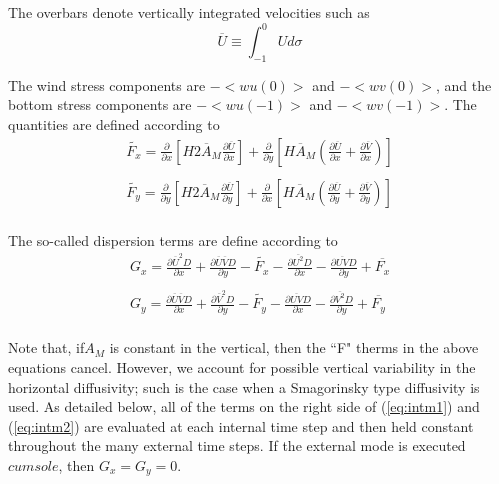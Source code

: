 \documentclass[oribibl]{llncs}
\begin{document}
The overbars denote vertically integrated velocities such as
\begin{equation}
\overline{U} \equiv \int_{-1}^{0} U d \sigma
\end{equation}

The wind stress components are $-<wu(0)>$  and $-<wv(0)> $, and the bottom stress components are $-<wu(-1)>$  and $-<wv(-1)> $. The quantities are defined according to
\begin{eqnarray}
\tilde{F_x}=\frac{\partial}{\partial x} \left[ H2 \overline{A}_M \frac{\partial \overline{U}}{\partial x} \right] +\frac{\partial}{\partial y} \left[ H \overline{A}_M \left( \frac{\partial \overline{U}}{\partial x} + \frac{\partial \overline{V}}{\partial x}\right) \right] \\
\nonumber\\
\tilde{F_y}=\frac{\partial}{\partial y} \left[ H2 \overline{A}_M \frac{\partial \overline{U}}{\partial y} \right] +\frac{\partial}{\partial x} \left[ H \overline{A}_M \left( \frac{\partial \overline{U}}{\partial y} + \frac{\partial \overline{V}}{\partial y}\right) \right] \\
\end{eqnarray}

The so-called dispersion terms are define according to
\begin{eqnarray}
G_x=\frac{\partial \overline{U}^2 D}{\partial x} +\frac{\partial \overline{U} \overline{V} D}{\partial y} -  \tilde{F_x} - \frac{\partial \overline{U^2} D}{\partial x} -\frac{\partial \overline{UV} D}{\partial y} + \overline{F_x}\\
\nonumber\\
G_y=\frac{\partial \overline{U}\overline{V} D}{\partial x} +\frac{\partial \overline{V} ^2 D}{\partial y} -  \tilde{F_y} - \frac{\partial \overline{UV} D}{\partial x} -\frac{\partial \overline{V^2} D}{\partial y} + \overline{F_y}\\
\end{eqnarray}

Note that, if$ A_M$ is constant in the vertical, then the ``F" therms in the above equations cancel. However, we account for possible vertical variability in the horizontal diffusivity; such is the case when a Smagorinsky type diffusivity is used. As detailed below, all of the terms on the right side of (\ref{eq:intm1}) and (\ref{eq:intm2}) are evaluated at each internal time step and then held constant throughout the many external time steps. If the external mode is executed $cum sole$, then $G_x=G_y=0$.
\end{document}

